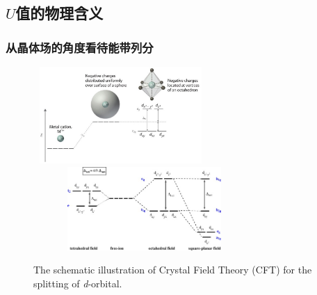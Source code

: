 {\subsection{$U$值的物理含义}
\frame
{
	\frametitle{从晶体场的角度看待能带列分}
\begin{figure}[h!]
\centering
\vspace*{-0.22in}
\includegraphics[height=1.45in,width=2.62in,viewport=0 0 585 350,clip]{Figures/Crystal-Field-Theory.jpg}
\includegraphics[height=1.25in,width=3.32in,viewport=0 0 315 170,clip]{Figures/Crystal-Field-Theory_energy.jpg}
\caption{\tiny \textrm{The schematic illustration of Crystal Field Theory (CFT) for the splitting of \textit{d}-orbital.}}%
\label{CFT_d-splitting}
\end{figure}
}
 
}
